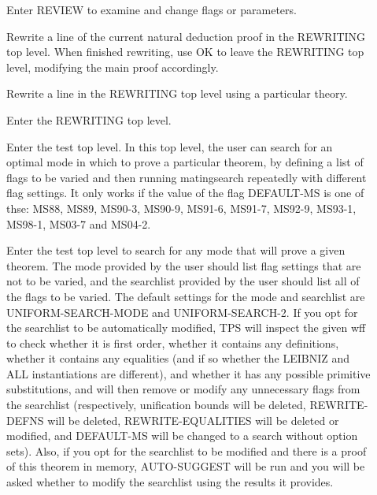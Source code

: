 \begin{description}
\item[\parbox{\textwidth}{REVIEW}]  
Enter REVIEW to examine and change flags or parameters.

\item[\parbox{\textwidth}{REWRITE \textit{p2} \textit{p1} \textit{a} \textit{b} \textit{p2-hyps} \textit{p1-hyps}}]  
Rewrite a line of the current natural deduction proof in the
REWRITING top level. When finished rewriting, use OK to leave the REWRITING top
level, modifying the main proof accordingly.

\item[\parbox{\textwidth}{REWRITE-IN \textit{theory} \textit{p2} \textit{p1} \textit{a} \textit{b} \textit{p2-hyps} \textit{p1-hyps}}]  
Rewrite a line in the REWRITING top level using a particular
theory.

\item[\parbox{\textwidth}{REWRITING}]  
Enter the REWRITING top level.

\item[\parbox{\textwidth}{TEST \textit{gwff} \textit{deepen} \textit{reinit} \textit{window}}]  
Enter the test top level. In this top level, the user can search
for an optimal mode in which to prove a particular theorem, by defining
a list of flags to be varied and then running matingsearch repeatedly 
with different flag settings.
It only works if the value of the flag DEFAULT-MS is one of thse:
MS88, MS89, MS90-3, MS90-9, MS91-6, MS91-7, MS92-9, MS93-1, MS98-1, 
MS03-7 and MS04-2.

\item[\parbox{\textwidth}{UNIFORM-SEARCH \textit{gwff} \textit{window} \textit{mode} \textit{slist} \textit{modify}}]  
Enter the test top level to search for any mode that will prove
a given theorem. The mode provided by the user should list flag settings
that are not to be varied, and the searchlist provided by the user should
list all of the flags to be varied. The default settings for the mode and
searchlist are UNIFORM-SEARCH-MODE and UNIFORM-SEARCH-2.
If you opt for the searchlist to be automatically modified, TPS will inspect
the given wff to check whether it is first order, whether it contains any 
definitions, whether it contains any equalities (and if so whether the LEIBNIZ
and ALL instantiations are different), and whether it has any possible primitive
substitutions, and will then remove or modify any unnecessary flags from the 
searchlist (respectively, unification bounds will be deleted, REWRITE-DEFNS will
be deleted, REWRITE-EQUALITIES will be deleted or modified, and DEFAULT-MS will
be changed to a search without option sets).
Also, if you opt for the searchlist to be modified and there is a proof of this
theorem in memory, AUTO-SUGGEST will be run and you will be asked whether to 
modify the searchlist using the results it provides.


\end{description}
